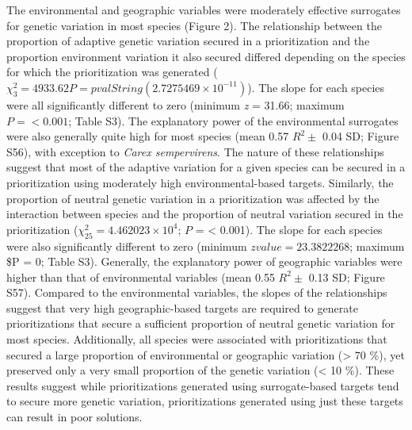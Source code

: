 \documentclass[11pt,]{article}
\begin{document}
The environmental and geographic variables were moderately effective
surrogates for genetic variation in most species (Figure 2). The
relationship between the proportion of adaptive genetic variation
secured in a prioritization and the proportion environment variation it
also secured differed depending on the species for which the
prioritization was generated
(\(\chi^2_{3} = {4933.62} P = pvalString(2.7275469\times 10^{-11})\)).
The slope for each species were all significantly different to zero
(minimum \textit{z} = 31.66; maximum \(P = < 0.001\); Table S3). The
explanatory power of the environmental surrogates were also generally
quite high for most species (mean 0.57 \(R^2 \pm\) 0.04 SD; Figure S56),
with exception to \emph{Carex sempervirens}. The nature of these
relationships suggest that most of the adaptive variation for a given
species can be secured in a prioritization using moderately high
environmental-based targets. Similarly, the proportion of neutral
genetic variation in a prioritization was affected by the interaction
between species and the proportion of neutral variation secured in the
prioritization (\(\chi^2_{25} = 4.462023\times 10^{4}\); \(P\) =
\textless{} 0.001). The slope for each species were also significantly
different to zero (minimum \(z value = 23.3822268\); maximum \$P = 0;
Table S3). Generally, the explanatory power of geographic variables were
higher than that of environmental variables (mean 0.55 \(R^2 \pm\) 0.13
SD; Figure S57). Compared to the environmental variables, the slopes of
the relationships suggest that very high geographic-based targets are
required to generate prioritizations that secure a sufficient proportion
of neutral genetic variation for most species. Additionally, all species
were associated with prioritizations that secured a large proportion of
environmental or geographic variation (\textgreater{} 70 \%), yet
preserved only a very small proportion of the genetic variation
(\textless{} 10 \%). These results suggest while prioritizations
generated using surrogate-based targets tend to secure more genetic
variation, prioritizations generated using just these targets can result
in poor solutions.
\end{document}
